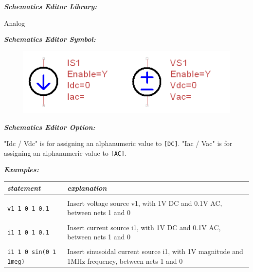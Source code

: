 \textbf{\textit{Schematics Editor Library:}}

Analog

\textbf{\textit{Schematics Editor Symbol:}}

\begin{figure}[htb]
  \begin{center}
    \includegraphics[height=0.08\textheight]{./pics/SpiceEl/IV.png}
  \end{center}
\end{figure}

\textbf{\textit{Schematics Editor Option:}}

"\textsf{Idc / Vdc}"  is for assigning an alphanumeric value to \texttt{[DC]}. "\textsf{Iac / Vac}"  is for assigning an alphanumeric value to \texttt{[AC]}.

\textbf{\textit{Examples:}}

\begin{longtable}{l l}
\textit{statement} & \textit{explanation} \\ \hline \\ \vspace{-0.8\parskip} 
\begin{minipage}{15em}\texttt{v1 1 0 1 0.1}\end{minipage}  
& 
\begin{minipage}{15em}{\small Insert voltage source v1, with 1V DC and 0.1V AC, between nets 1 and 0}\end{minipage}  \\ \\ 
\begin{minipage}{15em}\texttt{i1 1 0 1 0.1}\end{minipage}  
& 
\begin{minipage}{15em}{\small Insert current source i1, with 1V DC and 0.1V AC, between nets 1 and 0}\end{minipage}  \\ \\ 
\begin{minipage}{15em}\texttt{i1 1 0 sin(0 1 1meg)}\end{minipage}  
& 
\begin{minipage}{15em}{\small Insert sinusoidal current source i1, with 1V magnitude and 1MHz frequency, between nets 1 and 0}\end{minipage}
\end{longtable}


